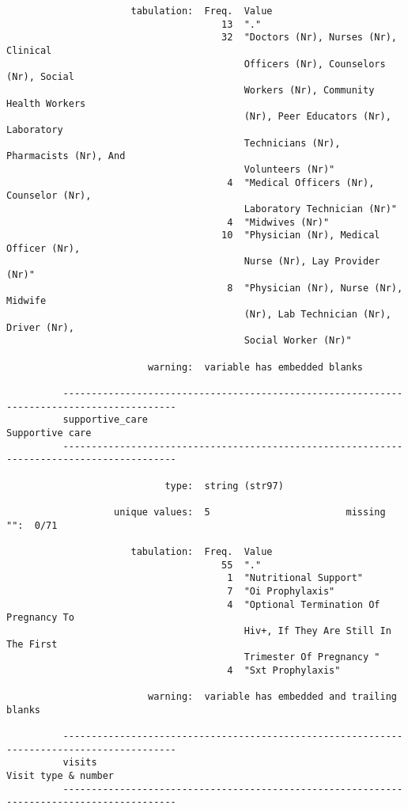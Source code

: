 \documentclass{article}
\begin{document}
\begin{verbatim}
                      tabulation:  Freq.  Value
                                      13  "."
                                      32  "Doctors (Nr), Nurses (Nr), Clinical
                                          Officers (Nr), Counselors (Nr), Social
                                          Workers (Nr), Community Health Workers
                                          (Nr), Peer Educators (Nr), Laboratory
                                          Technicians (Nr), Pharmacists (Nr), And
                                          Volunteers (Nr)"
                                       4  "Medical Officers (Nr), Counselor (Nr),
                                          Laboratory Technician (Nr)"
                                       4  "Midwives (Nr)"
                                      10  "Physician (Nr), Medical Officer (Nr),
                                          Nurse (Nr), Lay Provider (Nr)"
                                       8  "Physician (Nr), Nurse (Nr), Midwife
                                          (Nr), Lab Technician (Nr), Driver (Nr),
                                          Social Worker (Nr)"
          
                         warning:  variable has embedded blanks
          
          ------------------------------------------------------------------------------------------
          supportive_care                                                            Supportive care
          ------------------------------------------------------------------------------------------
          
                            type:  string (str97)
          
                   unique values:  5                        missing "":  0/71
          
                      tabulation:  Freq.  Value
                                      55  "."
                                       1  "Nutritional Support"
                                       7  "Oi Prophylaxis"
                                       4  "Optional Termination Of Pregnancy To
                                          Hiv+, If They Are Still In The First
                                          Trimester Of Pregnancy "
                                       4  "Sxt Prophylaxis"
          
                         warning:  variable has embedded and trailing blanks
          
          ------------------------------------------------------------------------------------------
          visits                                                                 Visit type & number
          ------------------------------------------------------------------------------------------
          

\end{verbatim}
\end{document}

